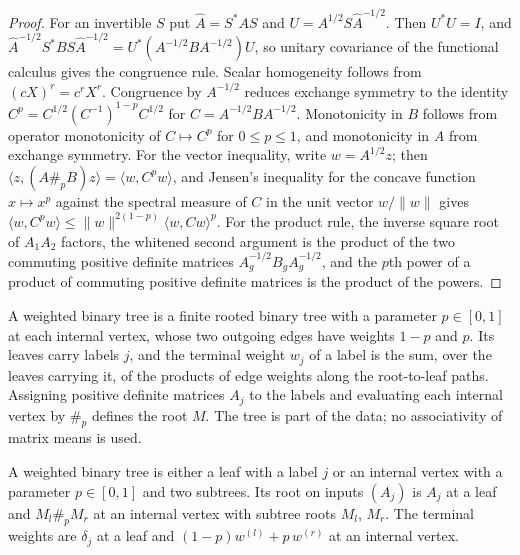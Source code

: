 \begin{proof}\leanok
    For an invertible $S$ put $\widehat A=S^*AS$ and
    $U=A^{1/2}S\widehat A^{-1/2}$. Then $U^*U=I$, and
    $\widehat A^{-1/2}S^*BS\widehat A^{-1/2}=U^*(A^{-1/2}BA^{-1/2})U$, so
    unitary covariance of the functional calculus gives the congruence rule.
    Scalar homogeneity follows from $(cX)^r=c^rX^r$. Congruence by
    $A^{-1/2}$ reduces exchange symmetry to the identity
    $C^p=C^{1/2}(C^{-1})^{1-p}C^{1/2}$ for $C=A^{-1/2}BA^{-1/2}$.
    Monotonicity in $B$ follows from operator monotonicity of $C\mapsto C^p$
    for $0\le p\le1$, and monotonicity in $A$ from exchange symmetry. For the
    vector inequality, write $w=A^{1/2}z$; then
    $\langle z,(A\#_pB)z\rangle=\langle w,C^pw\rangle$, and Jensen's inequality
    for the concave function $x\mapsto x^p$ against the spectral measure of $C$
    in the unit vector $w/\|w\|$ gives
    $\langle w,C^pw\rangle\le\|w\|^{2(1-p)}\langle w,Cw\rangle^p$. For the
    product rule, the inverse square root of $A_1A_2$ factors, the whitened
    second argument is the product of the two commuting positive definite
    matrices $A_g^{-1/2}B_gA_g^{-1/2}$, and the $p$th power of a product of
    commuting positive definite matrices is the product of the powers.
\end{proof}

A weighted binary tree is a finite rooted binary tree with a parameter
$p\in[0,1]$ at each internal vertex, whose two outgoing edges have weights
$1-p$ and $p$. Its leaves carry labels $j$, and the terminal weight $w_j$ of a
label is the sum, over the leaves carrying it, of the products of edge weights
along the root-to-leaf paths. Assigning positive definite matrices $A_j$ to the
labels and evaluating each internal vertex by $\#_p$ defines the root $M$. The
tree is part of the data; no associativity of matrix means is used.

\begin{definition}\label{def:mean_tree}
    \leanok
    A weighted binary tree is either a leaf with a label $j$ or an internal
    vertex with a parameter $p\in[0,1]$ and two subtrees. Its root on inputs
    $(A_j)$ is $A_j$ at a leaf and $M_l\#_pM_r$ at an internal vertex with
    subtree roots $M_l$, $M_r$. The terminal weights are $\delta_j$ at a leaf
    and $(1-p)w^{(l)}+p\,w^{(r)}$ at an internal vertex.
\end{definition}

